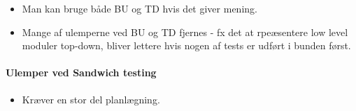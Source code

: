 \begin{itemize}
	\item Man kan bruge både BU og TD hvis det giver mening.
	\item Mange af ulemperne ved BU og TD fjernes - fx det at rpeæsentere low level moduler top-down, bliver lettere hvis nogen af tests er udført i bunden først.
\end{itemize}

\paragraph{Ulemper ved Sandwich testing}

\begin{itemize}
	\item Kræver en stor del planlægning.
\end{itemize}